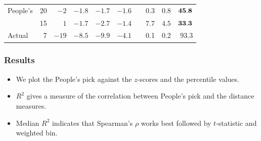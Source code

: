 \documentclass{beamer}
\begin{document}
\begin{frame}
\begin{table}[hbt]
\begin{tabular}{l r rrrr r rrr}
People's  	& 20 & $-2$ & $-1.8$ & $-1.7$ & $ -1.6$ & & $0.3$ & $0.8$ & $\bf 45.8$ \\[-0.5ex]  
		 & 15 & $1$ & $-1.7$ & $-2.7$ & $ -1.4$ & & $7.7$ & $4.5$ & $\bf 33.3$ \\[-0.5ex]

\hline
Actual & 7  & $-19$ & $-8.5$ & $-9.9$ & $-4.1$ & & 0.1 & 0.2 & 93.3\\[1ex]
\hline
\end{tabular}
\label{sca_table}
\end{table}

\end{frame}


\begin{frame}
\frametitle{Results}
\begin{itemize}
\item We plot the People's pick against the $z$-scores and the percentile values.
\item $R^2$ gives a measure of the correlation between People's pick and the distance measures.
\item Median $R^2$ indicates that Spearman's $\rho$ works best followed by $t$-statistic and weighted bin.
\end{itemize}
\end{frame}

\end{document}
